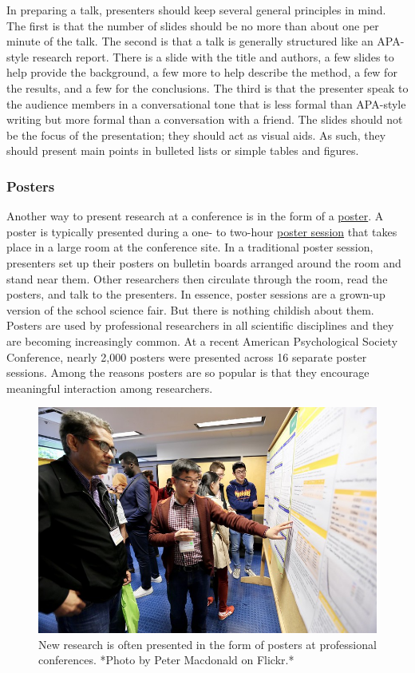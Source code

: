 \documentclass[
]{krantz}
\begin{document}
In preparing a talk, presenters should keep several general principles in mind. The first is that the number of slides should be no more than about one per minute of the talk. The second is that a talk is generally structured like an APA-style research report. There is a slide with the title and authors, a few slides to help provide the background, a few more to help describe the method, a few for the results, and a few for the conclusions. The third is that the presenter speak to the audience members in a conversational tone that is less formal than APA-style writing but more formal than a conversation with a friend. The slides should not be the focus of the presentation; they should act as visual aids. As such, they should present main points in bulleted lists or simple tables and figures.

\hypertarget{posters}{%
\subsubsection*{Posters}\label{posters}}


Another way to present research at a conference is in the form of a \protect\hyperlink{poster}{poster}. A poster is typically presented during a one- to two-hour \protect\hyperlink{poster-session}{poster session} that takes place in a large room at the conference site. In a traditional poster session, presenters set up their posters on bulletin boards arranged around the room and stand near them. Other researchers then circulate through the room, read the posters, and talk to the presenters. In essence, poster sessions are a grown-up version of the school science fair. But there is nothing childish about them. Posters are used by professional researchers in all scientific disciplines and they are becoming increasingly common. At a recent American Psychological Society Conference, nearly 2,000 posters were presented across 16 separate poster sessions. Among the reasons posters are so popular is that they encourage meaningful interaction among researchers.

\begin{figure}

{\centering \includegraphics[width=0.6\linewidth]{images/ch11/poster} 

}

\caption{New research is often presented in the form of posters at professional conferences. *Photo by Peter Macdonald on Flickr.*}\label{fig:poster}
\end{figure}
\end{document}
